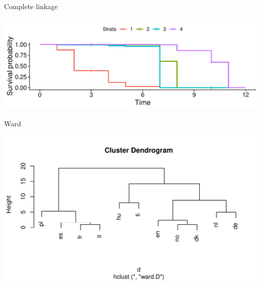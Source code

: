 \begin{frame}[fragile]{Complete linkage}
  
\begin{knitrout}
\color{fgcolor}\begin{kframe}
\begin{alltt}
\hlkwb{=}\hlstd{=}\hlstd{)}
\end{alltt}
\end{kframe}
\includegraphics[width=\maxwidth]{figure/unnamed-chunk-12-1} 

\end{knitrout}
  
\end{frame}

\begin{frame}[fragile]{Ward}
  
\begin{knitrout}
\color{fgcolor}\begin{kframe}
\begin{alltt}
\hlkwb{=}\hlstd{=}\hlstd{)}
\end{alltt}
\end{kframe}
\includegraphics[width=\maxwidth]{figure/wardo-1} 

\end{knitrout}
  
\end{frame}

